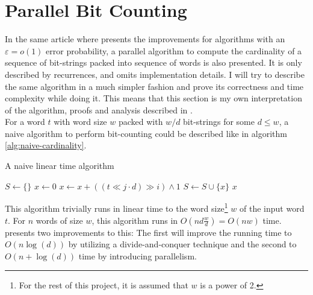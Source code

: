 \section{Parallel Bit Counting}
In the same article where \citet{fast-similarity-search} presents the improvements for algorithms with an $\varepsilon = o(1)$ error probability, a parallel algorithm to compute the cardinality of a sequence of bit-strings packed into sequence of words is also presented. It is only described by recurrences, and omits implementation details. I will try to describe the same algorithm in a much simpler fashion and prove its correctness and time complexity while doing it. This means that this section is my own interpretation of the algorithm, proofs and analysis described in \cite{fast-similarity-search}.\\
For a word $t$ with word size $w$ packed with $w/d$ bit-strings for some $d \leq w$, a naive algorithm to perform bit-counting could be described like in algorithm \ref{alg:naive-cardinality}.
\begin{algorithm}[H]
\caption{A naive linear time algorithm}\label{alg:naive-cardinality}
\begin{algorithmic}[1]
\State $S \gets \{\}$
\State $x \gets 0$
\State $x \gets x + ((t \ll j \cdot d) \gg i) \land 1$
\EndFor
\State $S \gets S \cup \{ x \}$
\EndFor
\State \Return $x$
\EndFunction
\end{algorithmic}
\end{algorithm}
This algorithm trivially runs in linear time to the word size\footnote{For the rest of this project, it is assumed that $w$ is a power of 2.} $w$ of the input word $t$. For $n$ words of size $w$, this algorithm runs in $O(n d \frac{w}{d}) = O(n w)$ time.
\citet{fast-similarity-search} presents two improvements to this: The first will improve the running time to $O(n\log(d))$ by utilizing a divide-and-conquer technique and the second to $O(n + \log(d))$ time by introducing parallelism. %
